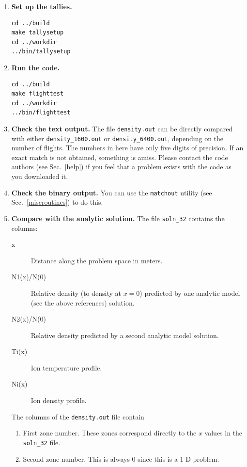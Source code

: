 \documentclass[12pt]{report}
\begin{document}
\begin{enumerate}
contains the specification of the number of flights to be run. Open this
file in an editor (Emacs will be the most convenient) and find the line
\begin{verbatim}
 source_num_flights = 100 ;
\end{verbatim}
Change the ``100'' to either ``1600'' or ``6400''. The example contains the
output for both cases. Save the file and exit the editor.
  \item {\bf Set up the tallies.} 
\begin{verbatim}
cd ../build
make tallysetup
cd ../workdir
../bin/tallysetup
\end{verbatim}
  \item {\bf Run the code.}
\begin{verbatim}
cd ../build
make flighttest
cd ../workdir
../bin/flighttest
\end{verbatim}
  \item {\bf Check the text output.} The file {\tt density.out} can be directly
compared with either {\tt density\_1600.out} or {\tt density\_6400.out},
depending on the number of flights. The numbers in here have only five
digits of precision. If an exact match is not obtained, something is
amiss. Please contact the code authors (see Sec.~\ref{help}) if you feel
that a problem exists with the code as you downloaded it. 
  \item {\bf Check the binary output.} You can use the {\tt matchout}
utility (see Sec.~\ref{miscroutines}) to do this. 
  \item {\bf Compare with the analytic solution.} The file {\tt soln\_32}
contains the columns:
\begin{description}
  \item[x] Distance along the problem space in meters.
  \item[N1(x)/N(0)] Relative density (to density at $x=0$) predicted by
one analytic model (see the above references) solution.
  \item[N2(x)/N(0)] Relative density predicted by a second analytic model
solution.
  \item[Ti(x)] Ion temperature profile.
  \item[Ni(x)] Ion density profile.
\end{description}
The columns of the {\tt density.out} file contain
\begin{enumerate}
  \item First zone number. These zones correspond directly to the $x$
values in the {\tt soln\_32} file.
  \item Second zone number. This is always 0 since this is a 1-D problem.

\end{enumerate}
\end{enumerate}
\end{document}
